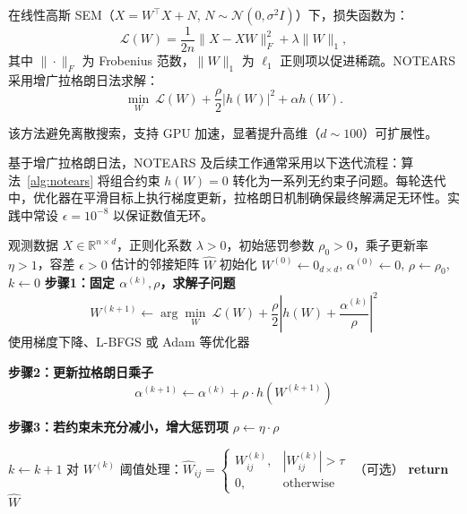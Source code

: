 在线性高斯 SEM（$X = W^\top X + N$, $N \sim \mathcal{N}(0, \sigma^2 I)$）下，损失函数为：
\[
\mathcal{L}(W) = \frac{1}{2n} \|X - XW\|_F^2 + \lambda \|W\|_1,
\]
其中 $\|\cdot\|_F$ 为 Frobenius 范数，$\|W\|_1$ 为 $\ell_1$ 正则项以促进稀疏。NOTEARS 采用增广拉格朗日法求解：
\[
\min_W \ \mathcal{L}(W) + \frac{\rho}{2} |h(W)|^2 + \alpha h(W).
\]

该方法避免离散搜索，支持 GPU 加速，显著提升高维（$d \sim 100$）可扩展性。

基于增广拉格朗日法，NOTEARS 及后续工作通常采用以下迭代流程：算法~\ref{alg:notears} 将组合约束 $h(W)=0$ 转化为一系列无约束子问题。每轮迭代中，优化器在平滑目标上执行梯度更新，拉格朗日机制确保最终解满足无环性。实践中常设 $\epsilon = 10^{-8}$ 以保证数值无环。

\begin{algorithm}[htbp]
	\caption{基于连续优化的 DAG 学习框架（以 NOTEARS 为例）}
	\label{alg:notears}
	\begin{algorithmic}[1]
		\REQUIRE 观测数据 $X \in \mathbb{R}^{n \times d}$，正则化系数 $\lambda > 0$，初始惩罚参数 $\rho_0 > 0$，乘子更新率 $\eta > 1$，容差 $\epsilon > 0$
		\ENSURE 估计的邻接矩阵 $\hat{W}$
		\STATE 初始化 $W^{(0)} \gets 0_{d \times d}$, $\alpha^{(0)} \gets 0$, $\rho \gets \rho_0$, $k \gets 0$
		\STATE \textbf{步骤1：固定 $\alpha^{(k)}, \rho$，求解子问题}
		\[
		W^{(k+1)} \gets \arg\min_{W} \ \mathcal{L}(W) + \frac{\rho}{2} \left| h(W) + \frac{\alpha^{(k)}}{\rho} \right|^2
		\]
		使用梯度下降、L-BFGS 或 Adam 等优化器

		\STATE \textbf{步骤2：更新拉格朗日乘子}
		\[
		\alpha^{(k+1)} \gets \alpha^{(k)} + \rho \cdot h(W^{(k+1)})
		\]

		\STATE \textbf{步骤3：若约束未充分减小，增大惩罚项}
		\STATE $\rho \gets \eta \cdot \rho$
		\ENDIF

		\STATE $k \gets k + 1$
		\ENDWHILE
		\STATE 对 $W^{(k)}$ 阈值处理：$\hat{W}_{ij} = \begin{cases}
			W^{(k)}_{ij}, & |W^{(k)}_{ij}| > \tau \\
			0, & \text{otherwise}
		\end{cases}$ （可选）
		\STATE \textbf{return} $\hat{W}$
	\end{algorithmic}
\end{algorithm}

